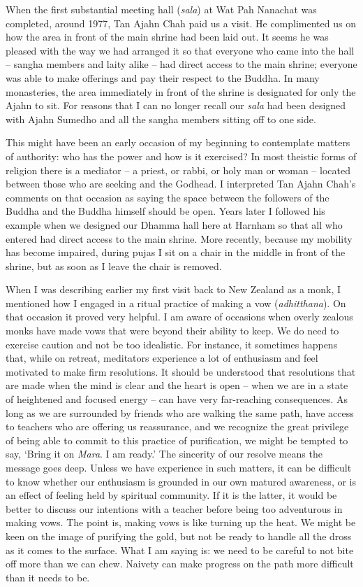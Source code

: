 When the first substantial meeting hall (\emph{sala}) at Wat Pah
Nanachat was completed, around 1977, Tan Ajahn Chah paid us a visit. He
complimented us on how the area in front of the main shrine had been
laid out. It seems he was pleased with the way we had arranged it so
that everyone who came into the hall -- sangha members and laity alike
-- had direct access to the main shrine; everyone was able to make
offerings and pay their respect to the Buddha. In many monasteries, the
area immediately in front of the shrine is designated for only the Ajahn
to sit. For reasons that I can no longer recall our \emph{sala} had been
designed with Ajahn Sumedho and all the sangha members sitting off to
one side.

This might have been an early occasion of my beginning to contemplate
matters of authority: who has the power and how is it exercised? In most
theistic forms of religion there is a mediator -- a priest, or rabbi, or
holy man or woman -- located between those who are seeking and the
Godhead. I interpreted Tan Ajahn Chah's comments on that occasion as
saying the space between the followers of the Buddha and the Buddha
himself should be open. Years later I followed his example when we
designed our Dhamma hall here at Harnham so that all who entered had
direct access to the main shrine. More recently, because my mobility has
become impaired, during pujas I sit on a chair in the middle in front of
the shrine, but as soon as I leave the chair is removed.

When I was describing earlier my first visit back to New Zealand as a
monk, I mentioned how I engaged in a ritual practice of making a vow
(\emph{adhitthana}). On that occasion it proved very helpful. I am aware
of occasions when overly zealous monks have made vows that were beyond
their ability to keep. We do need to exercise caution and not be too
idealistic. For instance, it sometimes happens that, while on retreat,
meditators experience a lot of enthusiasm and feel motivated to make
firm resolutions. It should be understood that resolutions that are made
when the mind is clear and the heart is open -- when we are in a state
of heightened and focused energy -- can have very far-reaching
consequences. As long as we are surrounded by friends who are walking
the same path, have access to teachers who are offering us reassurance,
and we recognize the great privilege of being able to commit to this
practice of purification, we might be tempted to say, `Bring it on
\emph{Mara}. I am ready.' The sincerity of our resolve means the message
goes deep. Unless we have experience in such matters, it can be
difficult to know whether our enthusiasm is grounded in our own matured
awareness, or is an effect of feeling held by spiritual community. If it
is the latter, it would be better to discuss our intentions with a
teacher before being too adventurous in making vows. The point is,
making vows is like turning up the heat. We might be keen on the image
of purifying the gold, but not be ready to handle all the dross as it
comes to the surface. What I am saying is: we need to be careful to not
bite off more than we can chew. Naivety can make progress on the path
more difficult than it needs to be.

